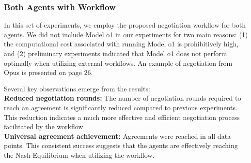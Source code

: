 \subsubsection{Both Agents with Workflow}
In this set of experiments, we employ the proposed negotiation workflow for both agents. We did not include Model o1 in our experiments for two main reasons: (1) the computational cost associated with running Model o1 is prohibitively high, and (2) preliminary experiments indicated that Model o1 does not perform optimally when utilizing external workflows. An example of negotiation from Opus is presented on page 26.

\begin{table}[!ht]
    \centering
    \caption{Workflow-LLM vs. Workflow-LLM}
    \label{tab:both_workflow}
\end{table}

Several key observations emerge from the results:\\
\textbf{Reduced negotiation rounds:} The number of negotiation rounds required to reach an agreement is significantly reduced compared to previous experiments. This reduction indicates a much more effective and efficient negotiation process facilitated by the workflow.\\
\textbf{Universal agreement achievement:} Agreements were reached in all data points. This consistent success suggests that the agents are effectively reaching the Nash Equilibrium when utilizing the workflow.

